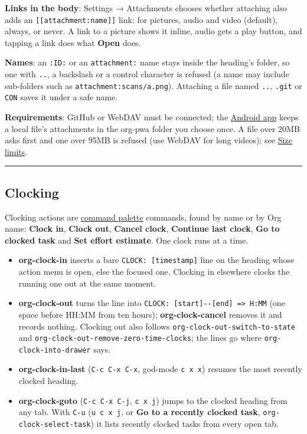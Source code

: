 \documentclass[11pt]{article}
\begin{document}
\textbf{Links in the body}: Settings → Attachments chooses whether attaching also adds an \texttt{[[attachment:name]]} link: for pictures, audio and video (default), always, or never. A link to a picture shows it inline, audio gets a play button, and tapping a link does what \textbf{Open} does.

\textbf{Names}: an \texttt{:ID:} or an \texttt{attachment:} name stays inside the heading's folder, so one with \texttt{..}, a backslash or a control character is refused (a name may include sub-folders such as \texttt{attachment:scans/a.png}). Attaching a file named \texttt{..}, \texttt{.git} or \texttt{CON} saves it under a safe name.

\textbf{Requirements}: GitHub or WebDAV must be connected; the \hyperref[sec:org5b8e0d4]{Android app} keeps a local file's attachments in the org-pwa folder you choose once. A file over 20MB asks first and one over 95MB is refused (use WebDAV for long videos); see \hyperref[sec:orgd916704]{Size limits}.

\noindent\rule{\textwidth}{0.5pt}

\subsection{Clocking}
\label{sec:org6e1340d}
Clocking actions are \hyperref[sec:org55cb874]{command palette} commands, found by name or by Org name: \textbf{Clock in}, \textbf{Clock out}, \textbf{Cancel clock}, \textbf{Continue last clock}, \textbf{Go to clocked task} and \textbf{Set effort estimate}. One clock runs at a time.

\begin{itemize}
\item \textbf{org-clock-in} inserts a bare \texttt{CLOCK: [timestamp]} line on the heading whose action menu is open, else the focused one. Clocking in elsewhere clocks the running one out at the same moment.
\item \textbf{org-clock-out} turns the line into \texttt{CLOCK: [start]-{}-{}[end] =>  H:MM} (one space before HH:MM from ten hours); \textbf{org-clock-cancel} removes it and records nothing. Clocking out also follows \texttt{org-clock-out-switch-to-state} and \texttt{org-clock-out-remove-zero-time-clocks}; the lines go where \texttt{org-clock-into-drawer} says.
\item \textbf{org-clock-in-last} (\texttt{C-c C-x C-x}, god-mode \texttt{c x x}) resumes the most recently clocked heading.
\item \textbf{org-clock-goto} (\texttt{C-c C-x C-j}, \texttt{c x j}) jumps to the clocked heading from any tab. With \texttt{C-u} (\texttt{u c x j}, or \textbf{Go to a recently clocked task}, \texttt{org-clock-select-task}) it lists recently clocked tasks from every open tab.
\end{itemize}
\end{document}
